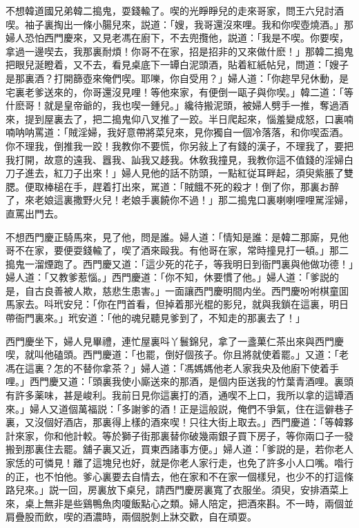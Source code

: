 不想韓道國兄弟韓二搗鬼，耍錢輸了。喫的光睜睜兒的走來哥家，問王六兒討酒喫。袖子裏掏出一條小腸兒來，説道：「嫂，我哥還沒來哩。我和你喫壺燒酒。」那婦人恐怕西門慶來，又見老馮在廚下，不去兜攬他，説道：「我是不喫。你要喫，拿過一邊喫去，我那裏耐煩！你哥不在家，招是招非的又來做什麽！」那韓二搗鬼把眼兒涎瞪着，又不去，看見桌底下一罈白泥頭酒，貼着紅紙帖兒，問道：「嫂子是那裏酒？打開篩壺來俺們喫。耶嚛，你自受用？」婦人道：「你趂早兒休動，是宅裏老爹送來的，你哥還沒見哩！等他來家，有便倒一甌子與你喫。」韓二道：「等什麽哥！就是皇帝爺的，我也喫一鍾兒。」纔待搬泥頭，被婦人劈手一推，奪過酒來，提到屋裏去了，把二搗鬼仰八叉推了一跤。半日爬起來，惱羞變成怒，口裏喃喃呐呐罵道：「賊淫婦，我好意帶將菜兒來，見你獨自一個冷落落，和你喫盃酒。你不理我，倒推我一跤！我教你不要慌，你另敍上了有錢的漢子，不理我了，要把我打開，故意的遠我、囂我、訕我又趍我。休敎我撞見，我教你這不值錢的淫婦白刀子進去，紅刀子出來！」婦人見他的話不防頭，一點紅従耳畔起，須臾紫脹了雙腮。便取棒槌在手，趕着打出來，駡道：「賊餓不死的殺才！倒了你，那裏お醉了，來老娘這裏撒野火兒！老娘手裏饒你不過！」那二搗鬼口裏喇喇哩哩駡淫婦，直罵出門去。

不想西門慶正騎馬來，見了他，問是誰。婦人道：「情知是誰：是韓二那廝，見他哥不在家，要便耍錢輸了，喫了酒來毆我。有他哥在家，常時撞見打一頓。」那二搗鬼一溜煙跑了。西門慶又道：「這少死的花子，等我明日到衙門裏與他做功德！」婦人道：「又教爹惹惱。」西門慶道：「你不知，休要慣了他。」婦人道：「爹説的是，自古良善被人欺，慈悲生患害。」一面讓西門慶明間内坐。西門慶吩咐棋童囬馬家去。呌玳安兒：「你在門首看，但掉着那光棍的影兒，就與我鎖在這裏，明日帶衙門裏來。」玳安道：「他的魂兒聽見爹到了，不知走的那裏去了！」

西門慶坐下，婦人見畢禮，連忙屋裏呌丫鬟錦兒，拿了一盞菓仁茶出來與西門慶喫，就叫他磕頭。西門慶道：「也罷，倒好個孩子。你且將就使着罷。」又道：「老馮在這裏？怎的不替你拿茶？」婦人道：「馮媽媽他老人家我央及他廚下使着手哩。」西門慶又道：「頭裏我使小廝送來的那酒，是個内臣送我的竹葉青酒哩。裏頭有許多薬味，甚是峻利。我前日見你這裏打的酒，通喫不上口，我所以拿的這罈酒來。」婦人又道個萬福説：「多謝爹的酒！正是這般説，俺們不爭氣，住在這僻巷子裏，又沒個好酒店，那裏得上樣的酒來喫！只往大街上取去。」西門慶道：「等韓夥計來家，你和他計較。等於獅子街那裏替你破幾兩銀子買下房子，等你兩口子一發搬到那裏住去罷。舖子裏又近，買東西諸事方便。」婦人道：「爹説的是，若你老人家恁的可憐見！離了這塊兒也好，就是你老人家行走，也免了許多小人口嘴。喒行的正，也不怕他。爹心裏要去自情去，他在家和不在家一個樣兒，也少不的打這條路兒來。」説一回，房裏放下桌兒，請西門慶房裏寬了衣服坐。須臾，安排酒菜上來，桌上無非是些鷄鴨魚肉嗄飯點心之類。婦人陪定，把酒來斟。不一時，兩個並肩疊股而飲，喫的酒濃時，兩個脱剝上牀交歡，自在頑耍。

